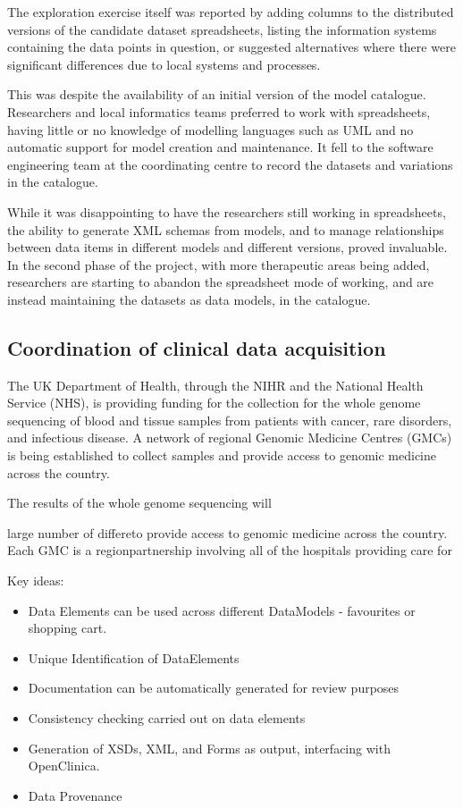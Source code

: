 The exploration exercise itself was reported by adding columns to the
distributed versions of the candidate dataset spreadsheets, listing
the information systems containing the data points in question, or
suggested alternatives where there were significant differences due to
local systems and processes.

This was despite the availability of an initial version of the model
catalogue.  Researchers and local informatics teams preferred to work
with spreadsheets, having little or no knowledge of modelling
languages such as UML and no automatic support for model creation and
maintenance.  It fell to the software engineering team at the
coordinating centre to record the datasets and variations in the
catalogue.

While it was disappointing to have the researchers still working in
spreadsheets, the ability to generate XML schemas from models, and to
manage relationships between data items in different models and
different versions, proved invaluable.  In the second phase of the
project, with more therapeutic areas being added, researchers are
starting to abandon the spreadsheet mode of working, and are instead
maintaining the datasets as data models, in the catalogue.

\subsection{Coordination of clinical data acquisition}

The UK Department of Health, through the NIHR and the National Health
Service (NHS), is providing funding for the collection for the whole
genome sequencing of blood and tissue samples from patients with
cancer, rare disorders, and infectious disease.  A network of regional
Genomic Medicine Centres (GMCs) is being established to collect
samples and provide access to genomic medicine across the country.

The results of the whole genome sequencing will 


large number of differeto
provide access to genomic medicine across the country.  Each GMC is a
regionpartnership involving all of the hospitals providing care for



Key ideas:

\begin{itemize}
	\item Data Elements can be used across different DataModels - favourites or shopping cart.
	\item Unique Identification of DataElements 
	\item Documentation can be automatically generated for review purposes
	\item Consistency checking carried out on data elements
	\item Generation of XSDs, XML, and Forms as output, interfacing with OpenClinica.
	\item Data Provenance
\end{itemize}

